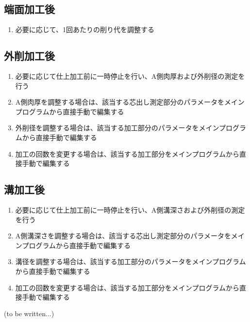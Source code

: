 \subsection{端面加工後}
\begin{enumerate}
\item 必要に応じて、1回あたりの削り代を調整する
\end{enumerate}


\subsection{外削加工後}
\begin{enumerate}
\item 必要に応じて仕上加工前に一時停止を行い、A側肉厚および外削径の測定を行う
\item A側肉厚を調整する場合は、該当する芯出し測定部分のパラメータをメインプログラムから直接手動で編集する
\item 外削径を調整する場合は、該当する加工部分のパラメータをメインプログラムから直接手動で編集する
\item 加工の回数を変更する場合は、該当する加工部分をメインプログラムから直接手動で編集する
\end{enumerate}


\subsection{溝加工後\TBW}
\begin{enumerate}
\item 必要に応じて仕上加工前に一時停止を行い、A側溝深さおよび外削径の測定を行う
\item A側溝深さを調整する場合は、該当する芯出し測定部分のパラメータをメインプログラムから直接手動で編集する
\item 溝径を調整する場合は、該当する加工部分のパラメータをメインプログラムから直接手動で編集する
\item 加工の回数を変更する場合は、該当する加工部分をメインプログラムから直接手動で編集する
\end{enumerate}


\clearpage
(to be written...)

